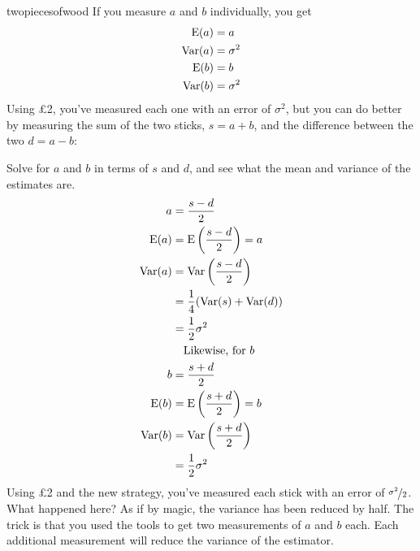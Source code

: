 \begin{answer}{twopiecesofwood}
If you measure $a$ and $b$ individually, you get
\begin{align*}
\operatorname{\mathrm{E}}(a)   &= a \\
\operatorname{\mathrm{Var}}(a) &= \sigma^2 \\
\operatorname{\mathrm{E}}(b)   &= b \\
\operatorname{\mathrm{Var}}(b) &= \sigma^2
\end{align*}
Using \pounds 2, you've measured each one with an error of $\sigma^2$, but you can do better
by measuring the sum of the two sticks, $s = a+b$, and the difference between the two $d = a-b$:
\begin{center}


\end{center}
Solve for $a$ and $b$ in terms of $s$ and $d$, and see what the mean and variance of the estimates are.
\begin{align*}
a   &= \frac{s - d}{2} \\
\operatorname{\mathrm{E}}(a)  &= \operatorname{\mathrm{E}}\left(\frac{s - d}{2}\right)
        =  a \\
\operatorname{\mathrm{Var}}(a) &= \operatorname{\mathrm{Var}}\left(\frac{s - d}{2} \right) \\
        &= \frac{1}{4}(\operatorname{\mathrm{Var}}(s) + \operatorname{\mathrm{Var}}(d)) \\
        &= \frac{1}{2}\sigma^2 \\
        & \quad \text{Likewise, for } b \\
b   &= \frac{s + d}{2} \\
\operatorname{\mathrm{E}}(b)  &= \operatorname{\mathrm{E}}\left(\frac{s + d}{2}\right)
        =  b \\
\operatorname{\mathrm{Var}}(b) &= \operatorname{\mathrm{Var}}\left(\frac{s + d}{2} \right) \\
        &= \frac{1}{2}\sigma^2
\end{align*}
Using \pounds 2 and the new strategy, you've measured each stick with an error of $\nicefrac{\sigma^2}{2}$.
What happened here? As if by magic, the variance has been reduced by half.
The trick is that you used the tools to get two measurements of $a$ and $b$ each.
Each additional measurement will reduce the variance of the estimator.
\end{answer}
